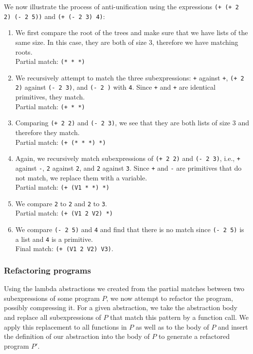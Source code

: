 \documentclass[a4paper,10pt]{article}
\begin{document}
We now illustrate the process of anti-unification using the expressions \texttt{(+ (+ 2 2) (- 2 5))} and \texttt{(+ (- 2 3) 4)}:
\begin{enumerate}
\item We first compare the root of the trees and make sure that we have lists of the same size. In this case, they are both of size $3$, therefore we have matching roots. \\
  Partial match: \texttt{(* * *)}
\item We recursively attempt to match the three subexpressions: \texttt{+} against \texttt{+}, \texttt{(+ 2 2)} against \texttt{(- 2 3)}, and \texttt{(- 2 )} with \texttt{4}. Since \texttt{+} and \texttt{+} are identical primitives, they match. \\
  Partial match: \texttt{(+ * *)}
\item Comparing \texttt{(+ 2 2)} and \texttt{(- 2 3)}, we see that they are both lists of size 3 and therefore they match. \\
  Partial match: \texttt{(+ (* * *) *)}
\item Again, we recursively match subexpressions of \texttt{(+ 2 2)} and \texttt{(- 2 3)}, i.e., \texttt{+} against \texttt{-}, \texttt{2} against \texttt{2}, and \texttt{2} against \texttt{3}. Since \texttt{+} and \texttt{-} are primitives that do not match, we replace them with a variable. \\
  Partial match: \texttt{(+ (V1 * *) *)}
\item We compare \texttt{2} to \texttt{2} and \texttt{2} to \texttt{3}. \\
  Partial match: \texttt{(+ (V1 2 V2) *)}
\item We compare \texttt{(- 2 5)} and \texttt{4} and find that there is no match since \texttt{(- 2 5)} is a list and \texttt{4} is a primitive. \\
  Final match: \texttt{(+ (V1 2 V2) V3)}.
\end{enumerate}


\subsubsection{Refactoring programs}
Using the lambda abstractions we created from the partial matches between two subexpressions of some program $P$, we now attempt to refactor the program, possibly compressing it. For a given abstraction, we take the abstraction body and replace all subexpressions of $P$ that match this pattern by a function call.  We apply this replacement to all functions in $P$ as well as to the body of $P$ and insert the definition of our abstraction into the body of $P$ to generate a refactored program $P'$.
\end{document}
